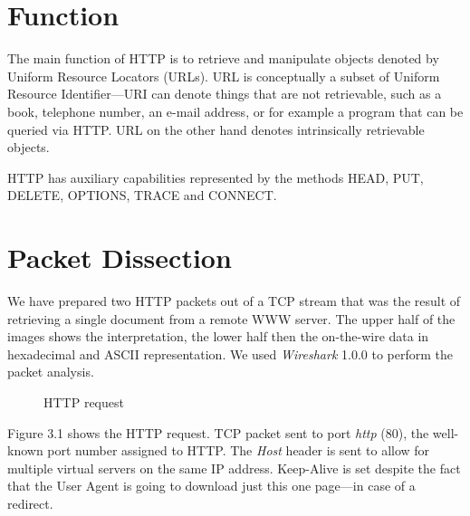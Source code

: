 \documentclass[10pt]{report}
\begin{document}

\section{Function}

The main function of HTTP is to retrieve and manipulate objects denoted
by Uniform Resource Locators (URLs).  URL is conceptually a subset of
Uniform Resource Identifier---URI can denote things that are not
retrievable, such as a book, telephone number, an e-mail address, or for
example a program that can be queried via HTTP.  URL on the other hand
denotes intrinsically retrievable objects. \cite{rfc1738}

HTTP has auxiliary capabilities represented by the methods HEAD, PUT,
DELETE, OPTIONS, TRACE and CONNECT.

\section{Packet Dissection}

We have prepared two HTTP packets out of a TCP stream that was the
result of retrieving a single document from a remote WWW server.  The
upper half of the images shows the interpretation, the lower half then
the on-the-wire data in hexadecimal and ASCII representation.  We used
{\em Wireshark} 1.0.0 to perform the packet analysis.

\begin{figure}[p]
    \label{httprequest}
    \centering
    \setlength\fboxsep{0pt}
    \setlength\fboxrule{0.5pt}
    \caption{HTTP request}
\end{figure}

Figure
%
3.1
%
shows the HTTP request.  TCP packet sent to port {\em
http} (80), the well-known port number assigned to HTTP.  The {\em Host}
header is sent to allow for multiple virtual servers on the same IP
address.  Keep-Alive is set despite the fact that the User Agent is
going to download just this one page---in case of a redirect.
\end{document}
